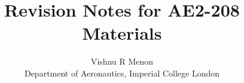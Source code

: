 \documentclass{summary_notes}
\begin{document}
\title{\bf Revision Notes for AE2-208 Materials}
\author{Vishnu R Menon\\ 
\small{Department of Aeronautics, Imperial College London}}
\maketitle
\tableofcontents
\newpage



\newpage
\end{document}
